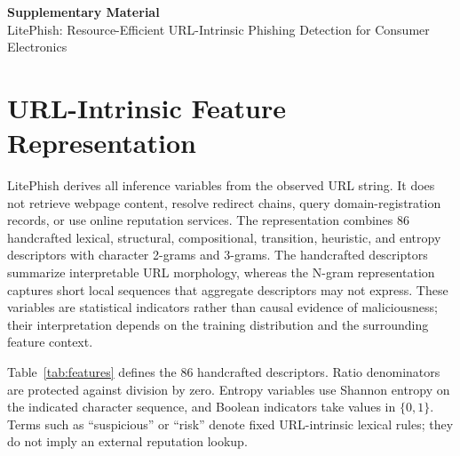 \documentclass[10pt]{article}
\begin{document}
\begin{center}
{\Large\bfseries Supplementary Material}\\[20pt]
{\large\color{supportingtext} LitePhish: Resource-Efficient URL-Intrinsic Phishing Detection for Consumer Electronics}
\end{center}

\color{black}

\section{URL-Intrinsic Feature Representation}

LitePhish derives all inference variables from the observed URL string. It does not retrieve webpage content, resolve redirect chains, query domain-registration records, or use online reputation services. The representation combines 86 handcrafted lexical, structural, compositional, transition, heuristic, and entropy descriptors with character 2-grams and 3-grams. The handcrafted descriptors summarize interpretable URL morphology, whereas the N-gram representation captures short local sequences that aggregate descriptors may not express. These variables are statistical indicators rather than causal evidence of maliciousness; their interpretation depends on the training distribution and the surrounding feature context.

Table~\ref{tab:features} defines the 86 handcrafted descriptors. Ratio denominators are protected against division by zero. Entropy variables use Shannon entropy on the indicated character sequence, and Boolean indicators take values in $\{0,1\}$. Terms such as ``suspicious'' or ``risk'' denote fixed URL-intrinsic lexical rules; they do not imply an external reputation lookup.
\end{document}

